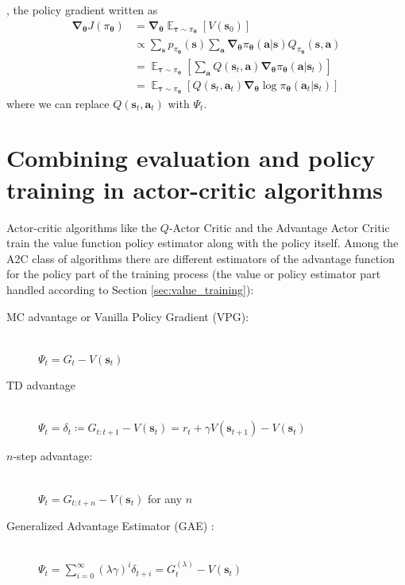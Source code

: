\documentclass{article}
\begin{document}
\cite{sutton_barto_rl}, the policy gradient written as\begin{equation}\begin{split}\boldsymbol{\nabla}_{\boldsymbol{\theta}}J(\pi_{\boldsymbol{\theta}})&=\boldsymbol{\nabla}_{\boldsymbol{\theta}}\mathop{\mathbb{E}}_{\boldsymbol{\tau}\sim\pi_{\boldsymbol{\theta}}}[V(\mathbf{s}_0)]\\&\propto\sum_\mathbf{s}p_{\pi_{\boldsymbol{\theta}}}(\mathbf{s})\sum_\mathbf{a}\boldsymbol{\nabla}_{\boldsymbol{\theta}}\pi_{\boldsymbol{\theta}}(\mathbf{a}|\mathbf{s})Q_{\pi_{\boldsymbol{\theta}}}(\mathbf{s},\mathbf{a})\\&=\mathop{\mathbb{E}}_{\boldsymbol{\tau}\sim\pi_{\boldsymbol{\theta}}}\left[\sum_\mathbf{a}Q(\mathbf{s}_t, \mathbf{a})\boldsymbol{\nabla}_{\boldsymbol{\theta}}\pi_{\boldsymbol{\theta}}(\mathbf{a}|\mathbf{s}_t)\right]\\&=\mathop{\mathbb{E}}_{\boldsymbol{\tau}\sim\pi_{\boldsymbol{\theta}}}\left[Q(\mathbf{s}_t, \mathbf{a}_t)\boldsymbol{\nabla}_{\boldsymbol{\theta}}\log\pi_{\boldsymbol{\theta}}(\mathbf{a}_t|\mathbf{s}_t)\right]\end{split}\end{equation}where we can replace $Q(\mathbf{s}_t,\mathbf{a}_t)$ with $\Psi_t$.

\section{Combining evaluation and policy training in actor-critic algorithms}
Actor-critic algorithms like the $Q$-Actor Critic and the Advantage Actor Critic train the value function policy estimator along with the policy itself. Among the A2C class of algorithms there are different estimators of the advantage function for the policy part of the training process (the value or policy estimator part handled according to Section \ref{sec:value_training}):
\begin{description}
\item[MC advantage or Vanilla Policy Gradient (VPG):]\hfill \\
$\Psi_t =G_t-V(\mathbf{s}_t)$
\item[TD advantage]\hfill \\
$\Psi_t =\delta_t\coloneqq G_{t:t+1}-V(\mathbf{s}_t)= r_t+\gamma V(\mathbf{s}_{t+1})-V(\mathbf{s}_t)$
\item[$n$-step advantage:]\hfill \\
$\Psi_t =G_{t:t+n}-V(\mathbf{s}_t)$ for any $n$
\item[Generalized Advantage Estimator (GAE) :]\hfill \\ 
$\Psi_t=\sum_{i=0}^\infty(\lambda\gamma)^i\delta_{t+i}=G^{(\lambda)}_t-V(\mathbf{s}_{t})$
\end{description}
\end{document}
